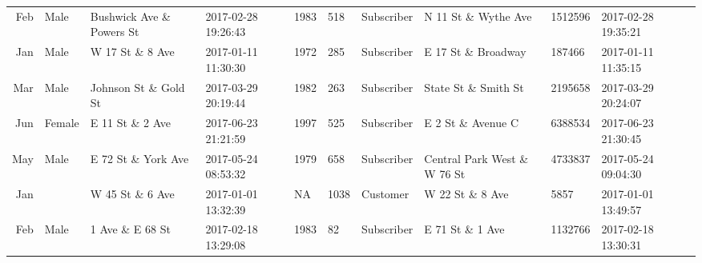 \documentclass[11pt]{article}
\begin{document}
\begin{tabular}{r|llllllllll}
	 Feb                              & Male                             & Bushwick Ave \& Powers St       & 2017-02-28 19:26:43              & 1983                             &  518                             & Subscriber                       & N 11 St \& Wythe Ave            & 1512596                          & 2017-02-28 19:35:21             \\
	 Jan                              & Male                             & W 17 St \& 8 Ave                & 2017-01-11 11:30:30              & 1972                             &  285                             & Subscriber                       & E 17 St \& Broadway             &  187466                          & 2017-01-11 11:35:15             \\
	 Mar                              & Male                             & Johnson St \& Gold St           & 2017-03-29 20:19:44              & 1982                             &  263                             & Subscriber                       & State St \& Smith St            & 2195658                          & 2017-03-29 20:24:07             \\
	 Jun                              & Female                           & E 11 St \& 2 Ave                & 2017-06-23 21:21:59              & 1997                             &  525                             & Subscriber                       & E 2 St \& Avenue C              & 6388534                          & 2017-06-23 21:30:45             \\
	 May                              & Male                             & E 72 St \& York Ave             & 2017-05-24 08:53:32              & 1979                             &  658                             & Subscriber                       & Central Park West \& W 76 St    & 4733837                          & 2017-05-24 09:04:30             \\
	 Jan                              &                                  & W 45 St \& 6 Ave                & 2017-01-01 13:32:39              &   NA                             & 1038                             & Customer                         & W 22 St \& 8 Ave                &    5857                          & 2017-01-01 13:49:57             \\
	 Feb                              & Male                             & 1 Ave \& E 68 St                & 2017-02-18 13:29:08              & 1983                             &   82                             & Subscriber                       & E 71 St \& 1 Ave                & 1132766                          & 2017-02-18 13:30:31             \\

\end{tabular}
\end{document}
